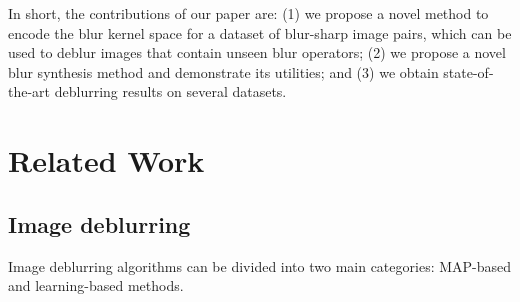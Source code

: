 \documentclass[final]{cvpr}
\begin{document}
In short, the contributions of our paper are: (1) we propose a novel method to encode the blur kernel space for a dataset of blur-sharp image pairs, which can be used to deblur images that contain unseen blur operators; (2) we propose a novel blur synthesis method and demonstrate its utilities; and (3) we obtain state-of-the-art deblurring results on several datasets.



\section{Related Work}
\subsection{Image deblurring}
Image deblurring algorithms can be divided into two main categories: MAP-based and learning-based methods. 
\end{document}
